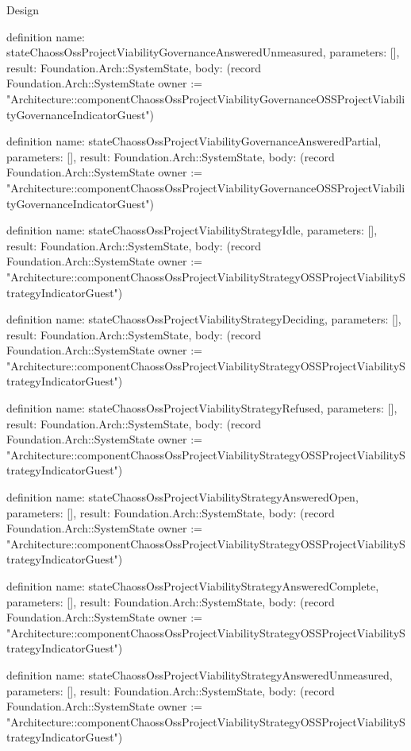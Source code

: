 \begin{lexlean}{Design}
\begin{semanticmodule}
definition{
  name: stateChaossOssProjectViabilityGovernanceAnsweredUnmeasured,
  parameters: [],
  result: Foundation.Arch::SystemState,
  body: (record Foundation.Arch::SystemState {owner := "Architecture::componentChaossOssProjectViabilityGovernanceOSSProjectViabilityGovernanceIndicatorGuest"})
}

definition{
  name: stateChaossOssProjectViabilityGovernanceAnsweredPartial,
  parameters: [],
  result: Foundation.Arch::SystemState,
  body: (record Foundation.Arch::SystemState {owner := "Architecture::componentChaossOssProjectViabilityGovernanceOSSProjectViabilityGovernanceIndicatorGuest"})
}

definition{
  name: stateChaossOssProjectViabilityStrategyIdle,
  parameters: [],
  result: Foundation.Arch::SystemState,
  body: (record Foundation.Arch::SystemState {owner := "Architecture::componentChaossOssProjectViabilityStrategyOSSProjectViabilityStrategyIndicatorGuest"})
}

definition{
  name: stateChaossOssProjectViabilityStrategyDeciding,
  parameters: [],
  result: Foundation.Arch::SystemState,
  body: (record Foundation.Arch::SystemState {owner := "Architecture::componentChaossOssProjectViabilityStrategyOSSProjectViabilityStrategyIndicatorGuest"})
}

definition{
  name: stateChaossOssProjectViabilityStrategyRefused,
  parameters: [],
  result: Foundation.Arch::SystemState,
  body: (record Foundation.Arch::SystemState {owner := "Architecture::componentChaossOssProjectViabilityStrategyOSSProjectViabilityStrategyIndicatorGuest"})
}

definition{
  name: stateChaossOssProjectViabilityStrategyAnsweredOpen,
  parameters: [],
  result: Foundation.Arch::SystemState,
  body: (record Foundation.Arch::SystemState {owner := "Architecture::componentChaossOssProjectViabilityStrategyOSSProjectViabilityStrategyIndicatorGuest"})
}

definition{
  name: stateChaossOssProjectViabilityStrategyAnsweredComplete,
  parameters: [],
  result: Foundation.Arch::SystemState,
  body: (record Foundation.Arch::SystemState {owner := "Architecture::componentChaossOssProjectViabilityStrategyOSSProjectViabilityStrategyIndicatorGuest"})
}

definition{
  name: stateChaossOssProjectViabilityStrategyAnsweredUnmeasured,
  parameters: [],
  result: Foundation.Arch::SystemState,
  body: (record Foundation.Arch::SystemState {owner := "Architecture::componentChaossOssProjectViabilityStrategyOSSProjectViabilityStrategyIndicatorGuest"})
}


\end{semanticmodule}
\end{lexlean}
